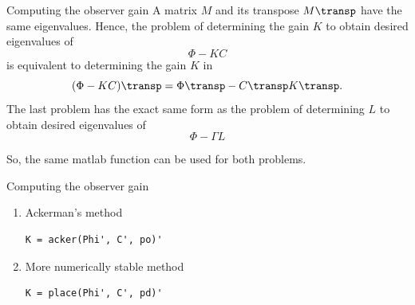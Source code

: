 \documentclass[presentation,aspectratio=1610]{beamer}
\begin{document}
\begin{frame}[label={sec:org4567bee}]{Computing the observer gain}
A matrix \(M\) and its transpose \(M\transp\) have the same eigenvalues. Hence, the problem of determining the gain \(K\) to obtain desired eigenvalues of 
\[\Phi- KC\] is equivalent to determining the gain \(K\) in 
\[(\Phi-KC)\transp = \Phi\transp - C\transp K\transp.\]
The last problem has the exact same form as the problem of determining \(L\) to obtain desired eigenvalues of 
\[\Phi - \Gamma L\]

So, the same matlab function can be used for both problems.
\end{frame}

\begin{frame}[label={sec:org8475baa},fragile]{Computing the observer gain}
 \begin{enumerate}
\item \alert{Ackerman's method} 
\begin{verbatim}
K = acker(Phi', C', po)'
\end{verbatim}
\item \alert{More numerically stable method} 
\begin{verbatim}
K = place(Phi', C', pd)'
\end{verbatim}
\end{enumerate}
\end{frame}
\end{document}
